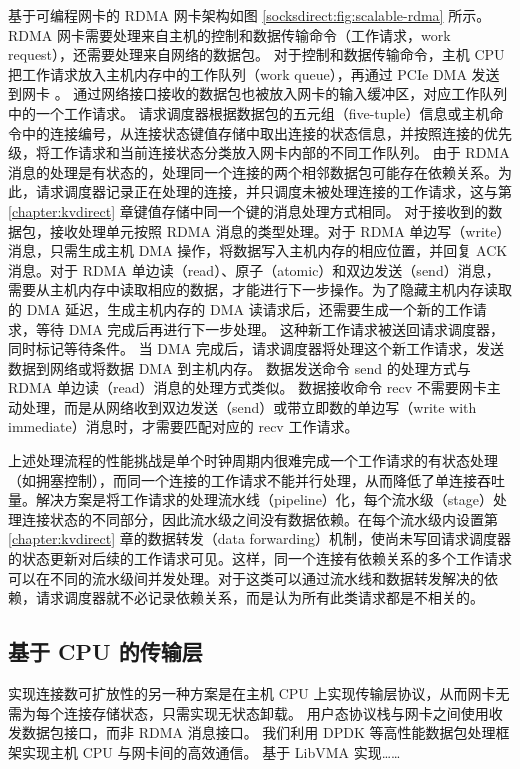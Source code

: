 基于可编程网卡的 RDMA 网卡架构如图 \ref{socksdirect:fig:scalable-rdma} 所示。
RDMA 网卡需要处理来自主机的控制和数据传输命令（工作请求，work request），还需要处理来自网络的数据包。
对于控制和数据传输命令，主机 CPU 把工作请求放入主机内存中的工作队列（work queue），再通过 PCIe DMA 发送到网卡 \cite{kalia2016design}。
通过网络接口接收的数据包也被放入网卡的输入缓冲区，对应工作队列中的一个工作请求。
请求调度器根据数据包的五元组（five-tuple）信息或主机命令中的连接编号，从连接状态键值存储中取出连接的状态信息，并按照连接的优先级，将工作请求和当前连接状态分类放入网卡内部的不同工作队列。
由于 RDMA 消息的处理是有状态的，处理同一个连接的两个相邻数据包可能存在依赖关系。为此，请求调度器记录正在处理的连接，并只调度未被处理连接的工作请求，这与第 \ref{chapter:kvdirect} 章键值存储中同一个键的消息处理方式相同。
对于接收到的数据包，接收处理单元按照 RDMA 消息的类型处理。对于 RDMA 单边写（write）消息，只需生成主机 DMA 操作，将数据写入主机内存的相应位置，并回复 ACK 消息。对于 RDMA 单边读（read）、原子（atomic）和双边发送（send）消息，需要从主机内存中读取相应的数据，才能进行下一步操作。为了隐藏主机内存读取的 DMA 延迟，生成主机内存的 DMA 读请求后，还需要生成一个新的工作请求，等待 DMA 完成后再进行下一步处理。
这种新工作请求被送回请求调度器，同时标记等待条件。
当 DMA 完成后，请求调度器将处理这个新工作请求，发送数据到网络或将数据 DMA 到主机内存。
数据发送命令 send 的处理方式与 RDMA 单边读（read）消息的处理方式类似。
数据接收命令 recv 不需要网卡主动处理，而是从网络收到双边发送（send）或带立即数的单边写（write with immediate）消息时，才需要匹配对应的 recv 工作请求。

上述处理流程的性能挑战是单个时钟周期内很难完成一个工作请求的有状态处理（如拥塞控制），而同一个连接的工作请求不能并行处理，从而降低了单连接吞吐量。解决方案是将工作请求的处理流水线（pipeline）化，每个流水级（stage）处理连接状态的不同部分，因此流水级之间没有数据依赖。在每个流水级内设置第 \ref{chapter:kvdirect} 章的数据转发（data forwarding）机制，使尚未写回请求调度器的状态更新对后续的工作请求可见。这样，同一个连接有依赖关系的多个工作请求可以在不同的流水级间并发处理。对于这类可以通过流水线和数据转发解决的依赖，请求调度器就不必记录依赖关系，而是认为所有此类请求都是不相关的。


\subsection{基于 CPU 的传输层}

实现连接数可扩放性的另一种方案是在主机 CPU 上实现传输层协议，从而网卡无需为每个连接存储状态，只需实现无状态卸载。
用户态协议栈与网卡之间使用收发数据包接口，而非 RDMA 消息接口。
我们利用 DPDK 等高性能数据包处理框架实现主机 CPU 与网卡间的高效通信。
基于 LibVMA 实现……





